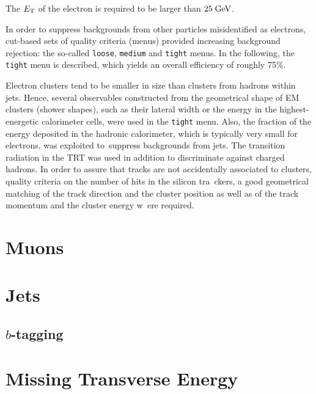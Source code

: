 The $\mbox{\ensuremath{E_{\mathrm{T}}}}$ of the electron is required to be larger than \mbox{$25 \; \mathrm{GeV}$}.

In order to suppress backgrounds from other particles misidentified as electrons, cut-based sets of quality criteria (menus)
provided increasing background rejection: the so-called \texttt{loose}, \texttt{medium} and \texttt{tight} menus.
In the following, the \texttt{tight} menu is described, which yields an overall efficiency of roughly 75\%.

Electron clusters tend to be smaller in size than clusters from hadrons within jets.
Hence, several observables constructed from the geometrical shape of EM clusters (shower shapes), such as their lateral width or
the energy in the highest-energetic calorimeter cells, were used in the \texttt{tight} menu.
Also, the fraction of the energy deposited in the hadronic calorimeter, which is typically very small for electrons, was exploited to\
 suppress
backgrounds from jets.
The transition radiation in the TRT was used in addition to discriminate against charged hadrons.
In order to assure that tracks are not accidentally associated to clusters, quality criteria on the number of hits in the silicon tra\
ckers,
a good geometrical matching of the track direction and the cluster position as well as of the track momentum and the cluster energy w\
ere required.


\section{Muons}
\label{sec:muons}

\section{Jets}
\label{sec:jets}

\subsection{$b$-tagging}
\label{sec:btag}

\section{Missing Transverse Energy}
\label{sec:met}

